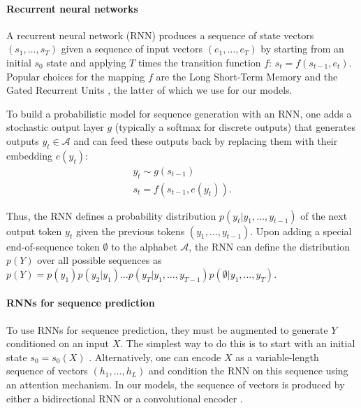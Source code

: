 \documentclass{article} %
\begin{document}
\paragraph{Recurrent neural networks}

A recurrent neural network (RNN) produces a sequence of state vectors $(s_1,
\ldots, s_T)$ given a sequence of input vectors $(e_1, \ldots, e_T)$ by
starting from an initial $s_0$ state and applying $T$ times the transition
function $f$: $s_{t} = f(s_{t-1}, e_t)$. Popular choices for the mapping $f$ are the Long Short-Term Memory \citep{hochreiter1997long} and the Gated
Recurrent Units \citep{cho2014learning}, the latter of which we use for our models. %

To build a probabilistic model for sequence generation with an RNN,
one adds a stochastic output layer $g$ (typically a softmax for discrete outputs)
that generates outputs $y_t \in \mathcal{A}$ 
and can feed these outputs back by replacing them with their embedding $e(y_t)$:
\begin{align}
    y_t \sim g(s_{t-1}) \\
    s_t = f(s_{t - 1}, e(y_t)).
\end{align}    

Thus, the RNN defines a probability distribution $p(y_t|y_1, \ldots, y_{t-1})$
of the next output token $y_t$ given the previous tokens $(y_1, \ldots, y_{t-1})$.
Upon adding a special end-of-sequence token $\emptyset$ to the alphabet
$\mathcal{A}$, the RNN can define the distribution $p(Y)$ over all possible
sequences as $p(Y) = p(y_1) p(y_2 | y_1) \ldots p(y_T|y_1, \ldots, y_{T - 1})
p(\emptyset | y_1, \ldots, y_T)$.

\paragraph{RNNs for sequence prediction}
To use RNNs for sequence prediction, they must be augmented 
to generate $Y$ conditioned on an input $X$. The simplest way to do this
is to start with an initial state $s_0=s_0(X)$ 
\citep{sutskever2014sequence,cho2014learning}. Alternatively, one can 
encode $X$ as a variable-length sequence of vectors $(h_1, \ldots, h_L)$ and condition
the RNN on this sequence using an attention mechanism.
In our models, the sequence of vectors is produced by either a bidirectional RNN
\citep{schuster1997bidirectional} or a convolutional encoder \citep{rush2015neural}.
\end{document}
